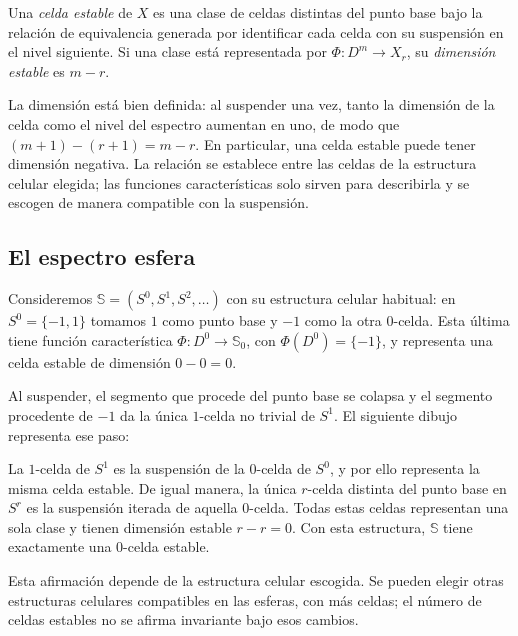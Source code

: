 \begin{defi}\label{defi:c10-celda-estable}
Una \emph{celda estable} de $X$ es una clase de celdas distintas del punto base bajo la relación de equivalencia generada por identificar cada celda con su suspensión en el nivel siguiente. Si una clase está representada por $\Phi\colon D^m\to X_r$, su \emph{dimensión estable} es $m-r$.
\end{defi}

La dimensión está bien definida: al suspender una vez, tanto la dimensión de la celda como el nivel del espectro aumentan en uno, de modo que $(m+1)-(r+1)=m-r$. En particular, una celda estable puede tener dimensión negativa. La relación se establece entre las celdas de la estructura celular elegida; las funciones características solo sirven para describirla y se escogen de manera compatible con la suspensión.

\subsection{El espectro esfera}

Consideremos $\mathbb S=(S^0,S^1,S^2,\ldots)$ con su estructura celular habitual: en $S^0=\{-1,1\}$ tomamos $1$ como punto base y $-1$ como la otra $0$-celda. Esta última tiene función característica $\Phi\colon D^0\to\mathbb S_0$, con $\Phi(D^0)=\{-1\}$, y representa una celda estable de dimensión $0-0=0$.

Al suspender, el segmento que procede del punto base se colapsa y el segmento procedente de $-1$ da la única $1$-celda no trivial de $S^1$. El siguiente dibujo representa ese paso:
\begin{center}
\end{center}
La $1$-celda de $S^1$ es la suspensión de la $0$-celda de $S^0$, y por ello representa la misma celda estable. De igual manera, la única $r$-celda distinta del punto base en $S^r$ es la suspensión iterada de aquella $0$-celda. Todas estas celdas representan una sola clase y tienen dimensión estable $r-r=0$. Con esta estructura, $\mathbb S$ tiene exactamente una $0$-celda estable.

Esta afirmación depende de la estructura celular escogida. Se pueden elegir otras estructuras celulares compatibles en las esferas, con más celdas; el número de celdas estables no se afirma invariante bajo esos cambios.
